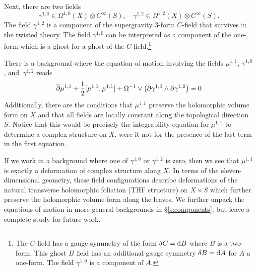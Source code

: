 Next, there are two fields 
\[
\gamma^{1,0} \in \Omega^{1,0} (X) \otimes C^\infty(S), \quad \gamma^{1,2} \in \Omega^{1,2}(X) \otimes C^\infty(S) .
\]
The field $\gamma^{1,2}$ is a component of the supergravity $3$-form $C$-field that survives in the twisted theory. 
The field $\gamma^{1,0}$ can be interpreted as a component of the one-form which is a ghost-for-a-ghost of the $C$-field.\footnote{The $C$-field has a gauge symmetry of the form $\delta C = {\rm d} B$ where $B$ is a two-form.
This ghost $B$ field has an additional gauge symmetry $\delta B = {\rm d} A$ for $A$ a one-form.
The field $\gamma^{1,0}$ is a component of $A$.}

There is a background where the equation of motion involving the fields $\mu^{1,1}$, $\gamma^{1,0}$,  and~$\gamma^{1,2}$ reads
\begin{align*}
\overline{\partial} \mu^{1,1} + \frac12 [\mu^{1,1}, \mu^{1,1}] + \Omega^{-1} \vee \left(\partial \gamma^{1,0} \wedge \partial \gamma^{1,2} \right) & = 0 \\
\end{align*}
Additionally, there are the conditions that $\mu^{1,1}$ preserve the holomorphic volume form on $X$ and that all fields are locally constant along the topological direction $S$.  
Notice that this would be precisely the integrability equation for $\mu^{1,1}$ to determine a complex structure on $X$, were it not for the presence of the last term in the first equation.

If we work in a background where one of $\gamma^{1,0}$ or $\gamma^{1,2}$ is zero, then we see that $\mu^{1,1}$ is exactly a deformation of complex structure along $X$. 
In terms of the eleven-dimensional geometry, these field configurations describe deformations of the natural transverse holomorphic foliation (THF structure) on $X \times S$ which further preserve the holomorphic volume form along the leaves.
We further unpack the equations of motion in more general backgrounds in \S \ref{s:components}, but leave a complete study for future work.


